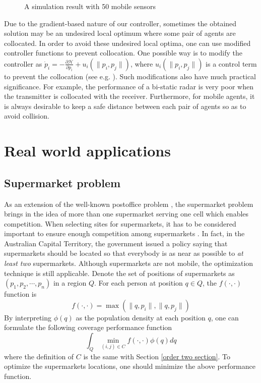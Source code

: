 \documentclass[letterpaper, 10 pt, conference]{ieeeconf}
\begin{document}
\begin{figure}[!ht]
\caption{A simulation result with 50 mobile sensors}\label{50SensorResult}
\end{figure}



Due to the gradient-based nature of our controller, sometimes the obtained solution may be an undesired local optimum where some pair of agents are collocated. In order to avoid these undesired local optima, one can use modified controller functions to prevent collocation. One possible way is to modify the controller as $\dot{p}_i = -\frac{\partial \mathcal{H}}{\partial p_i} + u_i(\|p_i,p_j\|)$, where $u_i(\|p_i,p_j\|)$ is a control term to prevent the collocation (see e.g. \cite{hussein2007effective}).
Such modifications also have much practical significance. For example, the performance of a bi-static radar is very poor when the transmitter is collocated with the receiver. Furthermore, for mobile agents, it is always desirable to keep a safe distance between each pair of agents so as to avoid collision.

\section{Real world applications}
\label{Real world applications}
\subsection{Supermarket problem}
\label{supermarket problem definition}
As an extension of the well-known postoffice problem \cite{clarkson1985probabilistic}, the supermarket problem brings in the idea of more than one supermarket serving one cell which enables competition. When selecting sites for supermarkets, it has to be considered important to ensure enough competition among supermarkets \cite{martin2009review}. In fact, in the Australian Capital Territory, the government issued  a policy saying that supermarkets should be located so that everybody is as near as possible to \textit{at least two} supermarkets.
Although supermarkets are not mobile, the optimization technique is still applicable.
Denote the set of positions of supermarkets as $(p_1, p_2,\cdots,p_n)$ in a region $Q$. For each person at position $q\in Q$, the $f(\cdot,\cdot)$ function is
$$f(\cdot,\cdot)= \max(\|q,p_i\|,\|q,p_j\|)$$
By interpreting $\phi(q)$ as  the population density at each position $q$, one can formulate the following coverage performance function
$$\int_Q \min_{(i,j)\in C} f(\cdot,\cdot) \phi(q) dq$$
where the definition of $C$ is the same with Section \ref{order two section}.
To optimize the supermarkets locations, one should minimize the above performance function.
\end{document}
